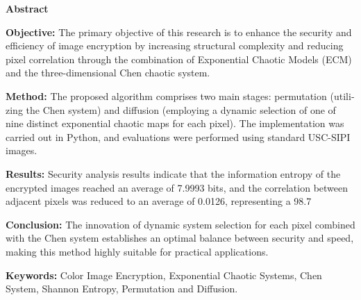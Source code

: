 \begin{latin}
\begin{center}
    {\Large \textbf{Abstract}}
\end{center}
\vspace{0.5cm}

\textbf{Objective:} The primary objective of this research is to enhance the security and efficiency of image encryption by increasing structural complexity and reducing pixel correlation through the combination of Exponential Chaotic Models (ECM) and the three-dimensional Chen chaotic system.

\textbf{Method:} The proposed algorithm comprises two main stages: permutation (utilizing the Chen system) and diffusion (employing a dynamic selection of one of nine distinct exponential chaotic maps for each pixel). The implementation was carried out in Python, and evaluations were performed using standard USC-SIPI images.

\textbf{Results:} Security analysis results indicate that the information entropy of the encrypted images reached an average of 7.9993 bits, and the correlation between adjacent pixels was reduced to an average of 0.0126, representing a 98.7%

\textbf{Conclusion:} The innovation of dynamic system selection for each pixel combined with the Chen system establishes an optimal balance between security and speed, making this method highly suitable for practical applications.

\vspace{1cm}
\textbf{Keywords:} Color Image Encryption, Exponential Chaotic Systems, Chen System, Shannon Entropy, Permutation and Diffusion.
\end{latin}
\newpage
